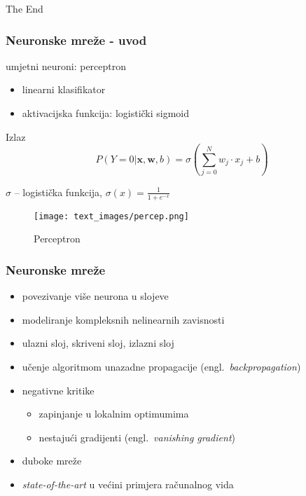 \documentclass[utf8]{beamer}
\newcommand{\engl}[1]{(engl.~\emph{#1})}
\begin{document}

\begin{frame}
\Huge{\centerline{The End}}
\end{frame}


\begin{frame}
\frametitle{Neuronske mreže - uvod}

umjetni neuroni: perceptron
\begin{itemize}
  \item linearni klasifikator
  \item aktivacijska funkcija: logistički sigmoid
\end{itemize}

\begin{block}{Izlaz}
\begin{equation}
P(Y = 0 | \boldsymbol{x}, \boldsymbol{w}, b) = \sigma(\sum_{j=0}^{N} w_j \cdot x_j + b)
\label{eq:sigmoid}
\end{equation}
\end{block}
$\sigma$ -- logistička funkcija,
$\sigma(x) = \frac{1}{1 + e^{-x}}$

\begin{figure}[htb]
\centering
\texttt{[image: text\_images/percep.png]}
\caption{Perceptron}
\end{figure}

\end{frame}


\begin{frame}
\frametitle{Neuronske mreže}

\begin{itemize}
  \item povezivanje više neurona u slojeve
  \item modeliranje kompleksnih nelinearnih zavisnosti
  \item ulazni sloj, skriveni sloj, izlazni sloj
  \item učenje algoritmom unazadne propagacije \engl{backpropagation}
  \item negativne kritike
  \begin{itemize}
    \item zapinjanje u lokalnim optimumima
    \item nestajući gradijenti \engl{vanishing gradient}
  \end{itemize}
  \item duboke mreže
  \item \textit{state-of-the-art} u većini primjera računalnog vida
\end{itemize}

\end{frame}
\end{document}
